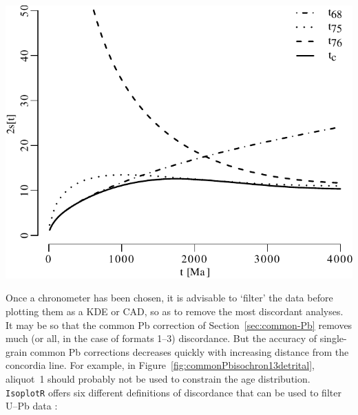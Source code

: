 \begin{refsection}
\noindent\begin{minipage}[t]{.6\linewidth}
\strut\newline
\includegraphics[width=\textwidth]{../figures/agerr.pdf}\\
\end{minipage}
\begin{minipage}[t]{.4\linewidth}
  \captionsetup{width=\textwidth} 
  \label{fig:precision}
\end{minipage}

Once a chronometer has been chosen, it is advisable to `filter' the
data before plotting them as a KDE or CAD, so as to remove the most
discordant analyses. It may be so that the common Pb correction of
Section~\ref{sec:common-Pb} removes much (or all, in the case of
formats 1--3) discordance. But the accuracy of single-grain common Pb
corrections decreases quickly with increasing distance from the
concordia line. For example, in
Figure~\ref{fig:commonPbisochron13detrital}, aliquot~1 should probably
not be used to constrain the age distribution. \texttt{IsoplotR}
offers six different definitions of discordance that can be used to
filter U--Pb data \citep{vermeesch2021}:


\end{refsection}
